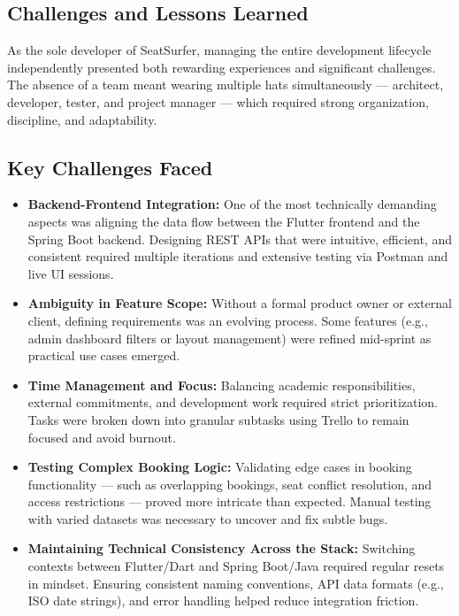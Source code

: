 \documentclass[12pt,a4paper]{report} %
\begin{document}
\subsection{Challenges and Lessons Learned}

As the sole developer of SeatSurfer, managing the entire development lifecycle independently presented both rewarding experiences and significant challenges. The absence of a team meant wearing multiple hats simultaneously — architect, developer, tester, and project manager — which required strong organization, discipline, and adaptability.

\subsection*{Key Challenges Faced}

\begin{itemize}
\item \textbf{Backend-Frontend Integration:}
One of the most technically demanding aspects was aligning the data flow between the Flutter frontend and the Spring Boot backend. Designing REST APIs that were intuitive, efficient, and consistent required multiple iterations and extensive testing via Postman and live UI sessions.
\item \textbf{Ambiguity in Feature Scope:}  
Without a formal product owner or external client, defining requirements was an evolving process. Some features (e.g., admin dashboard filters or layout management) were refined mid-sprint as practical use cases emerged.
\item \textbf{Time Management and Focus:}  
Balancing academic responsibilities, external commitments, and development work required strict prioritization. Tasks were broken down into granular subtasks using Trello to remain focused and avoid burnout.
\item \textbf{Testing Complex Booking Logic:}  
Validating edge cases in booking functionality — such as overlapping bookings, seat conflict resolution, and access restrictions — proved more intricate than expected. Manual testing with varied datasets was necessary to uncover and fix subtle bugs.
\item \textbf{Maintaining Technical Consistency Across the Stack:}  
Switching contexts between Flutter/Dart and Spring Boot/Java required regular resets in mindset. Ensuring consistent naming conventions, API data formats (e.g., ISO date strings), and error handling helped reduce integration friction.
\end{itemize}
\end{document}
